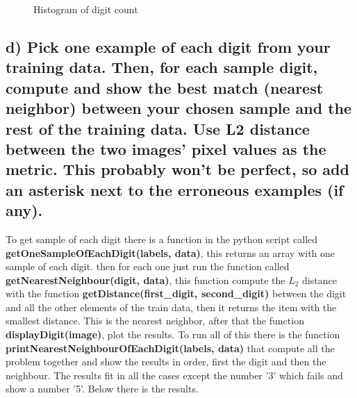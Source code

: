 \documentclass[11pt,letterpaper]{article}
\begin{document}
\begin{figure}[ht!]
\centering
{}
\caption{Histogram of digit count}\label{Digit Count}
\end{figure}

\subsection{d) Pick one example of each digit from your training data. Then, for each sample digit, compute and show the best match (nearest neighbor) between your chosen sample and the rest of the training data. Use L2 distance between the two images’ pixel values as the metric. This probably won’t be perfect, so add an asterisk next to the erroneous examples (if any).}
To get sample of each digit there is a function in the python script called \textbf{getOneSampleOfEachDigit(labels, data)}, this returns an array with one sample of each digit. then for each one just run the function called \textbf{getNearestNeighbour(digit, data)}, this function compute the $L_2$ distance with the function \textbf{getDistance(first\_digit, second\_digit)} between the digit and all the other elements of the train data, then it returns the item with the smallest distance. This is the nearest neighbor, after that the function \textbf{displayDigit(image)}, plot the results. To run all of this there is the function \textbf{printNearestNeighbourOfEachDigit(labels, data)} that compute all the problem together and show the results in order, first the digit and then the neighbour. The results fit in all the cases except the number '3' which fails and show a number '5'. Below there is the results.
\end{document}
